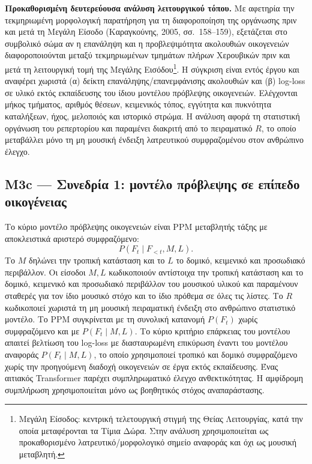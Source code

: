 \documentclass[11pt,a4paper]{article}
\begin{document}
\textbf{Προκαθορισμένη δευτερεύουσα ανάλυση λειτουργικού τόπου.} Με αφετηρία την τεκμηριωμένη μορφολογική παρατήρηση για τη διαφοροποίηση της οργάνωσης πριν και μετά τη Μεγάλη Είσοδο (Καραγκούνης, 2005, σσ.~158--159), εξετάζεται στο συμβολικό σώμα αν η επανάληψη και η προβλεψιμότητα ακολουθιών οικογενειών διαφοροποιούνται μεταξύ τεκμηριωμένων τμημάτων πλήρων Χερουβικών πριν και μετά τη λειτουργική τομή της Μεγάλης Εισόδου\footnote{Μεγάλη Είσοδος: κεντρική τελετουργική στιγμή της Θείας Λειτουργίας, κατά την οποία μεταφέρονται τα Τίμια Δώρα. Στην ανάλυση χρησιμοποιείται ως προκαθορισμένο λατρευτικό/μορφολογικό σημείο αναφοράς και όχι ως μουσική μεταβλητή.}. Η σύγκριση είναι εντός έργου και αναφέρει χωριστά (α) δείκτη επανάληψης/επανεμφάνισης ακολουθιών και (β) log-loss σε υλικό εκτός εκπαίδευσης του ίδιου μοντέλου πρόβλεψης οικογενειών. Ελέγχονται μήκος τμήματος, αριθμός θέσεων, κειμενικός τόπος, εγγύτητα και πυκνότητα καταλήξεων, ήχος, μελοποιός και ιστορικό στρώμα. Η ανάλυση αφορά τη στατιστική οργάνωση του ρεπερτορίου και παραμένει διακριτή από το πειραματικό $R$, το οποίο μεταβάλλει μόνο τη μη μουσική ένδειξη λατρευτικού συμφραζομένου στον ανθρώπινο έλεγχο.

\subsection{M3c — Συνεδρία 1: μοντέλο πρόβλεψης σε επίπεδο οικογένειας}\label{app:human-m3c-model}

Το κύριο μοντέλο πρόβλεψης οικογενειών είναι PPM μεταβλητής τάξης με αποκλειστικά αριστερό συμφραζόμενο:
\[
P(F_t\mid F_{<t},M,L).
\]
Το $M$ δηλώνει την τροπική κατάσταση και το $L$ το δομικό, κειμενικό και προσωδιακό περιβάλλον. Οι είσοδοι $M,L$ κωδικοποιούν αντίστοιχα την τροπική κατάσταση και το δομικό, κειμενικό και προσωδιακό περιβάλλον του μουσικού υλικού και παραμένουν σταθερές για τον ίδιο μουσικό στόχο και το ίδιο πρόθεμα σε όλες τις λίστες. Το $R$ κωδικοποιεί χωριστά τη μη μουσική πειραματική ένδειξη στο ανθρώπινο στατιστικό μοντέλο. Το PPM συγκρίνεται με τη συνολική κατανομή $P(F_t)$ χωρίς συμφραζόμενο και με $P(F_t\mid M,L)$. Το κύριο κριτήριο επάρκειας του μοντέλου απαιτεί βελτίωση του log-loss με διασταυρωμένη επικύρωση έναντι του μοντέλου αναφοράς $P(F_t\mid M,L)$, το οποίο χρησιμοποιεί τροπικό και δομικό συμφραζόμενο χωρίς την προηγούμενη διαδοχή οικογενειών σε έργα εκτός εκπαίδευσης. Ένας αιτιακός Transformer παρέχει συμπληρωματικό έλεγχο ανθεκτικότητας. Η αμφίδρομη συμπλήρωση χρησιμοποιείται μόνο ως βοηθητικός στόχος αναπαράστασης.
\end{document}
